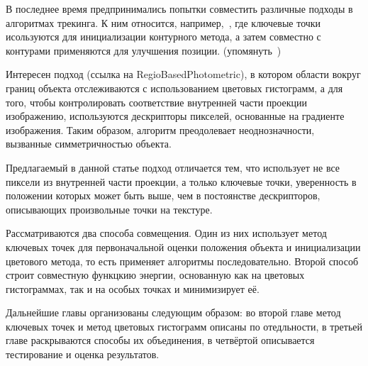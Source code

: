 В последнее время предпринимались попытки совместить различные подходы в
алгоритмах трекинга.
К ним относится, например,~\cite{Bugaev_2018_ECCV}, где ключевые точки
исользуются для инициализации контурного метода, а затем совместно с контурами
применяются для улучшения позиции.
(упомянуть~\cite{ColorFeature2018})

Интересен подход (ссылка на RegioBasedPhotometric), в котором области вокруг
границ объекта отслеживаются с использованием цветовых гистограмм, а для того,
чтобы контролировать соответствие внутренней части проекции изображению,
используются дескрипторы пикселей, основанные на градиенте изображения.
Таким образом, алгоритм преодолевает неоднозначности, вызванные симметричностью
объекта.


Предлагаемый в данной статье подход отличается тем, что использует не все
пиксели из внутренней части проекции, а только ключевые точки, уверенность в
положении которых может быть выше, чем в постоянстве дескрипторов, описывающих
произвольные точки на текстуре.

Рассматриваются два способа совмещения.
Один из них использует метод ключевых точек для первоначальной оценки положения
объекта и инициализации цветового метода, то есть применяет алгоритмы
последовательно.
Второй способ строит совместную функцкию энергии, основанную как на цветовых
гистограммах, так и на особых точках и минимизирует её.

Дальнейшие главы организованы следующим образом: во второй главе метод ключевых
точек и метод цветовых гистограмм описаны по отедльности, в третьей главе
раскрываются способы их объединения, в четвёртой описывается тестирование и
оценка результатов.
